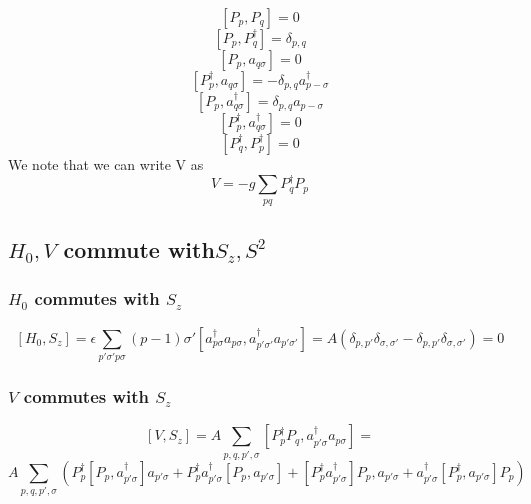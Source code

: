 \documentclass[11pt]{article} %
\begin{document}
\begin{equation}
\left[P_p, P_q\right]=0
\end{equation}
\begin{equation}
\left[P_p,P_q^\dagger\right]=\delta_{p,q}
\end{equation}
\begin{equation}
\left[P_p,a_{q\sigma}\right]=0
\end{equation}
\begin{equation}
\left[P_p^\dagger,a_{q\sigma}\right]=-\delta_{p,q}a_{p-\sigma}^\dagger
\end{equation}
\begin{equation}
\left[P_p,a_{q\sigma}^\dagger \right]=\delta_{p,q}a_{p -\sigma}\end{equation}
\begin{equation}
\left[P_p^\dagger,a_{q \sigma}^\dagger \right]=0\end{equation}
\begin{equation}
\left[P_q^\dagger,P_p^\dagger\right]=0\end{equation}
We note that we can write V as \\
\begin{equation}
V=-g\sum_{pq}P_q^\dagger P_p \end{equation}



\subsection{$H_0,V$ commute with$S_z, S^2$}
\subsubsection{$H_0$ commutes with $S_z$}
\begin{equation}
\left[H_0,S_z\right]=\epsilon \sum_{p' \sigma' p\sigma} \left(p-1\right) \sigma' \left[a_{p\sigma}^\dagger a_{p\sigma},a_{p'\sigma'}^\dagger a_{p'\sigma'}\right]=A\left(\delta_{p,p'}\delta_{\sigma,\sigma'}-\delta_{p,p'}\delta_{\sigma,\sigma'}\right)=0\end{equation}
\subsubsection{$V$ commutes with $S_z$}
\begin{equation}
\left[V,S_z\right]=A\sum_{p,q,p',\sigma}\left[P_p^\dagger P_q,a_{p'\sigma}^\dagger a_{p\sigma} \right]=
\end{equation}\begin{equation}A\sum_{p,q,p',\sigma}\left(P_{p}^\dagger\left[P_{p},a_{p'\sigma}^\dagger \right]a_{p'\sigma}+P_p^\dagger a_{p'\sigma}^\dagger \left[P_p,a_{p'\sigma}\right]+\left[P_p^\dagger a_{p'\sigma}^\dagger \right]P_p,a_{p'\sigma}+a_{p'\sigma}^\dagger \left[P_p^\dagger,a_{p'\sigma}\right]P_p\right)
\end{equation}
\end{document}
